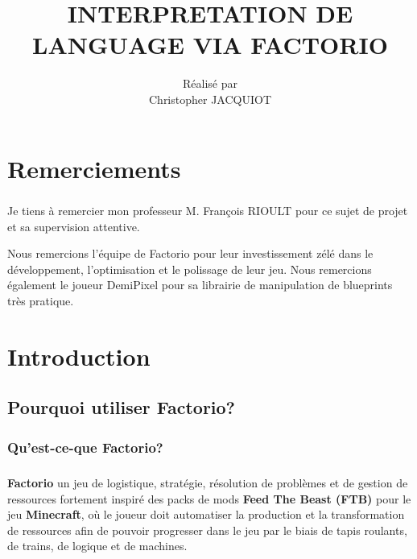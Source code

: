 \documentclass{scrreprt}
\title{\Huge \bfseries INTERPRETATION DE LANGUAGE VIA FACTORIO}
\author{Réalisé par \\Christopher JACQUIOT}
\date{}
\begin{document}
	
	
	
	\maketitle
	
	\tableofcontents
	\listoffigures
	\listoftables
	\chapter*{Remerciements}
	\paragraph{} 
	Je tiens à remercier mon professeur M. François RIOULT pour ce sujet de projet et sa supervision attentive.
	
	
	Nous remercions l'équipe de Factorio pour leur investissement zélé dans le développement, l'optimisation et le polissage de leur jeu.
	Nous remercions également le joueur DemiPixel pour sa librairie de manipulation de blueprints très pratique.
	
	
	\chapter{Introduction}
	
	\section{Pourquoi utiliser Factorio?}
	
	\subsection{Qu'est-ce-que Factorio?} 
	
	\paragraph{}
	
	\textbf{Factorio} un jeu de logistique, stratégie, résolution de problèmes et de gestion de ressources fortement inspiré des packs de mods \textbf{Feed The Beast (FTB)} pour le jeu \textbf{Minecraft}, où le joueur doit automatiser la production et la transformation de ressources afin de pouvoir progresser dans le jeu par le biais de tapis roulants, de trains, de logique et de machines.
	
\end{document}
